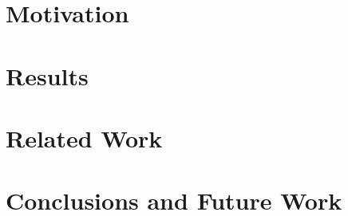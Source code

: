 \documentclass{llncs}
\begin{document}
%

\section{Motivation}
\label{sec:method}

\section{Results}
\label{sec:results}
 

\section{Related Work}
\label{sec:related}


\section{Conclusions and Future Work}
\label{sec:conclusion}




%



\end{document}
